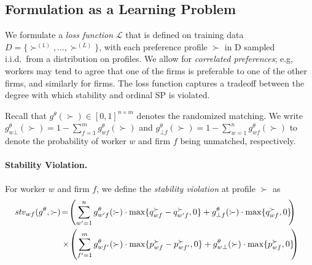 \documentclass[11pt,letterpaper]{article}
\theoremstyle{definition}
\newcommand{\kibitz}[2]{\ifnum\Comments=1{\color{#1}{#2}}\fi}
\newcommand{\zf}[1]{\kibitz{blue}{[ZF: #1]}}
\newcommand{\dcp}[1]{\kibitz{orange}{[DCP: #1]}}
\begin{document}
\subsection{Formulation as a Learning Problem}

We formulate a {\em loss function} $\mathcal L$ that  is defined on training data
$D=\{\succ^{(1)},\ldots,\succ^{(L)}\}$, with each preference
profile $\succ$ in D sampled i.i.d.~from a distribution  on profiles. 
%
We allow for {\em correlated preferences}; e.g, 
workers may tend to agree that one of the firms is preferable to
one of the other firms, and similarly for firms. 
%
The loss function  captures a tradeoff between the
degree with which stability  and ordinal SP is violated.
%
\dcp{(1) Define stability violation (which should follow as a relaxation of no justified envy), and will be in expectation over type profiles}
    
\dcp{(2) Define SP violation (should follow as a relaxation of convex-SP), and will be in expectation over type profiles}
    
\dcp{(3) Note that zero stability violation => stable up to measure zero , and zero SP violation => convex SP up to measure zero} \zf{Done}
    
    \fi
Recall that $g^\theta(\succ) \in [0, 1]^{n \times m}$ denotes the randomized matching. %
%
We write $g^\theta_{w\bot}(\succ) = 1 - \sum_{f = 1}^{m} g^\theta_{wf}(\succ)$ and $g^\theta_{\bot f}{(\succ)} = 1 - \sum_{w=1}^{n} g^\theta_{wf}(\succ)$ to denote the probability of worker $w$ and firm $f$ being unmatched, respectively. 

\paragraph{Stability Violation.}
For worker $w$ and firm $f$, we define the {\em   stability violation }
at profile $\succ$ as
%
\begin{align}
 \!\!\!\!       \mathit{stv}_{wf}(g^\theta, \succ) &\!=\! 
\left(\sum_{w' = 1}^{n} g^\theta_{w'f}(\succ)\cdot\max\{q_{wf}^\succ - q_{w'f}^\succ, 0\} + g^\theta_{\bot f}(\succ) \cdot\max\{q_{wf}^\succ, 0\}\!\!\right) \\ \notag
&  \times \! \left(\sum_{f' = 1}^{m} g^\theta_{wf'}(\succ)\cdot \max\{p_{wf}^\succ - p_{wf'}^\succ,0\} + g^\theta_{w\bot}(\succ) \cdot\max\{p_{wf}^\succ, 0\}\!\!\right)  
\end{align}
  
\end{document}
